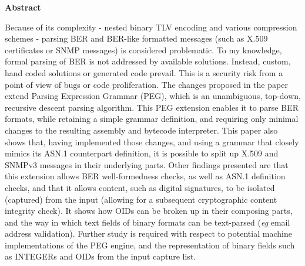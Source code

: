 \textbf{Abstract}

Because of its complexity - nested binary TLV encoding and various
compression schemes -
parsing BER and BER-like formatted messages (such as X.509 certificates or
SNMP messages) is considered problematic. To my
knowledge, formal parsing of BER is not
addressed by available solutions. Instead, custom, hand
coded solutions or generated code prevail. This is a security risk from a
point of view of bugs or code proliferation. The changes proposed in the
paper extend Parsing Expression Grammar
(PEG), which is an unambiguous, top-down, recursive descent parsing algorithm.
This PEG extension enables it to parse BER formats, while retaining a
simple grammar definition, and requiring only minimal changes to the
resulting assembly and bytecode interpreter. This paper also shows that,
having implemented those changes, and using a grammar that closely mimics
its ASN.1 counterpart definition, it is possible to split up X.509 and SNMPv3
messages in their underlying parts. Other findings presented
are that this extension allows BER well-formedness checks, as well as ASN.1
definition checks, and that it allows content, such as digital
signatures, to be isolated (captured) from the input (allowing for a subsequent
cryptographic content integrity check). It shows how OIDs
can be broken up in their composing parts, and the way in which text
fields of binary formats can be text-parsed (\textit{eg} email address
validation). Further study is required with respect to potential machine
implementations of the PEG engine, and the representation of binary
fields such as INTEGERs and OIDs from the input capture list.
